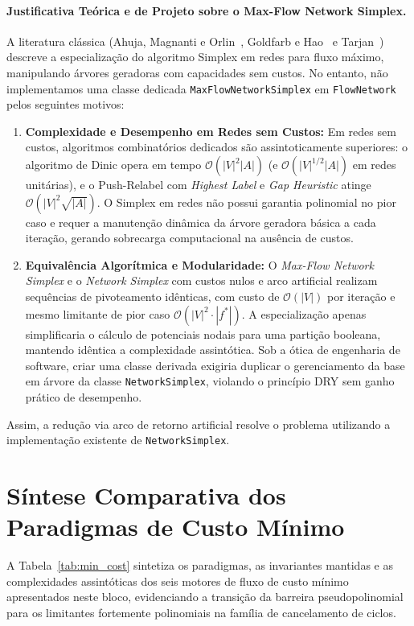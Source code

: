 \paragraph{Justificativa Teórica e de Projeto sobre o Max-Flow Network Simplex.}
A literatura clássica (Ahuja, Magnanti e Orlin~\cite{ahuja1993network}, Goldfarb e Hao~\cite{goldfarb1990primal} e Tarjan~\cite{tarjan1991efficiency}) descreve a especialização do algoritmo Simplex em redes para fluxo máximo, manipulando árvores geradoras com capacidades sem custos. No entanto, não implementamos uma classe dedicada \lstinline{MaxFlowNetworkSimplex} em \lstinline{FlowNetwork} pelos seguintes motivos:
\begin{enumerate}
    \item \textbf{Complexidade e Desempenho em Redes sem Custos:} Em redes sem custos, algoritmos combinatórios dedicados são assintoticamente superiores: o algoritmo de Dinic opera em tempo $\mathcal{O}(|V|^2 |A|)$ (e $\mathcal{O}(|V|^{1/2} |A|)$ em redes unitárias), e o Push-Relabel com \textit{Highest Label} e \textit{Gap Heuristic} atinge $\mathcal{O}(|V|^2 \sqrt{|A|})$. O Simplex em redes não possui garantia polinomial no pior caso e requer a manutenção dinâmica da árvore geradora básica a cada iteração, gerando sobrecarga computacional na ausência de custos.
    \item \textbf{Equivalência Algorítmica e Modularidade:} O \textit{Max-Flow Network Simplex} e o \textit{Network Simplex} com custos nulos e arco artificial realizam sequências de pivoteamento idênticas, com custo de $\mathcal{O}(|V|)$ por iteração e mesmo limitante de pior caso $\mathcal{O}(|V|^2 \cdot |f^*|)$. A especialização apenas simplificaria o cálculo de potenciais nodais para uma partição booleana, mantendo idêntica a complexidade assintótica. Sob a ótica de engenharia de software, criar uma classe derivada exigiria duplicar o gerenciamento da base em árvore da classe \lstinline{NetworkSimplex}, violando o princípio DRY sem ganho prático de desempenho.
\end{enumerate}
Assim, a redução via arco de retorno artificial resolve o problema utilizando a implementação existente de \lstinline{NetworkSimplex}.


\section{Síntese Comparativa dos Paradigmas de Custo Mínimo}

A Tabela~\ref{tab:min_cost} sintetiza os paradigmas, as invariantes mantidas e as complexidades assintóticas dos seis motores de fluxo de custo mínimo apresentados neste bloco, evidenciando a transição da barreira pseudopolinomial para os limitantes fortemente polinomiais na família de cancelamento de ciclos.

